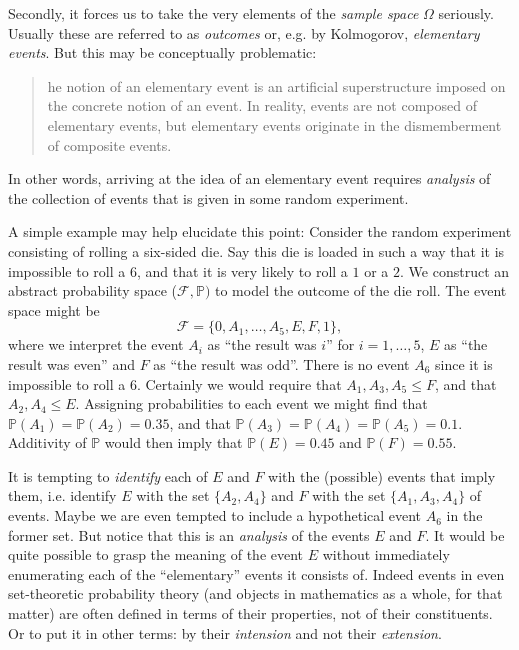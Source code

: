 \documentclass[article, a4paper, 11pt, oneside]{memoir}
\numberwithin{equation}{chapter}
\newcommand{\calF}{\mathcal{F}}
\renewcommand{\P}{\mathbb{P}}
\begin{document}
Secondly, it forces us to take the very elements of the \emph{sample space} $\Omega$ seriously. Usually these are referred to as \emph{outcomes} or, e.g. by Kolmogorov, \emph{elementary events}. But this may be conceptually problematic:
%
\blockquote[\cite{kolmogorov1995}]{
    he notion of an elementary event is an artificial superstructure imposed on the concrete notion of an event. In reality, events are not composed of elementary events, but elementary events originate in the dismemberment of composite events.
}
%
In other words, arriving at the idea of an elementary event requires \emph{analysis} of the collection of events that is given in some random experiment.

A simple example may help elucidate this point: Consider the random experiment consisting of rolling a six-sided die. Say this die is loaded in such a way that it is impossible to roll a $6$, and that it is very likely to roll a $1$ or a $2$. We construct an abstract probability space ($\calF, \P)$ to model the outcome of the die roll. The event space might be
%
\begin{equation*}
    \calF
        = \{ 0, A_1, \ldots, A_5, E, F, 1 \},
\end{equation*}
%
where we interpret the event $A_i$ as \enquote{the result was $i$} for $i = 1, \ldots, 5$, $E$ as \enquote{the result was even} and $F$ as \enquote{the result was odd}. There is no event $A_6$ since it is impossible to roll a $6$. Certainly we would require that $A_1, A_3, A_5 \leq F$, and that $A_2, A_4 \leq E$. Assigning probabilities to each event we might find that $\P(A_1) = \P(A_2) = 0.35$, and that $\P(A_3) = \P(A_4) = \P(A_5) = 0.1$. Additivity of $\P$ would then imply that $\P(E) = 0.45$ and $\P(F) = 0.55$.

It is tempting to \emph{identify} each of $E$ and $F$ with the (possible) events that imply them, i.e. identify $E$ with the set $\{A_2, A_4\}$ and $F$ with the set $\{A_1, A_3, A_4\}$ of events. Maybe we are even tempted to include a hypothetical event $A_6$ in the former set. But notice that this is an \emph{analysis} of the events $E$ and $F$. It would be quite possible to grasp the meaning of the event $E$ without immediately enumerating each of the \enquote{elementary} events it consists of. Indeed events in even set-theoretic probability theory (and objects in mathematics as a whole, for that matter) are often defined in terms of their properties, not of their constituents. Or to put it in other terms: by their \emph{intension} and not their \emph{extension}.
\end{document}

